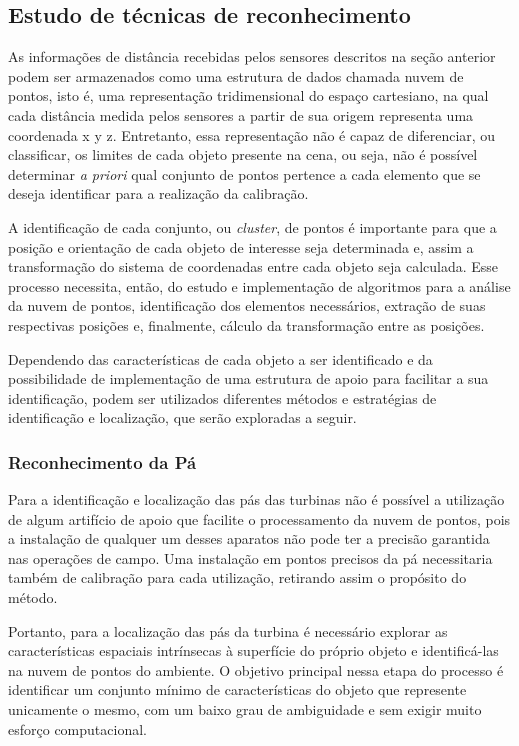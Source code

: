 \subsection{Estudo de técnicas de reconhecimento} 

As informações de distância recebidas pelos sensores descritos na seção
anterior podem ser armazenados como uma estrutura de dados chamada nuvem de
pontos, isto é, uma representação tridimensional do espaço cartesiano, na qual cada distância medida pelos
sensores a partir de sua origem representa uma coordenada x y z.
Entretanto, essa representação não é capaz de diferenciar, ou classificar, os
limites de cada objeto presente na cena, ou seja, não é possível determinar
\textit{a priori} qual conjunto de pontos pertence a cada elemento que se deseja
identificar para a realização da calibração.

A identificação de cada conjunto, ou \textit{cluster}, de pontos é importante
para que a posição e orientação de cada objeto de interesse seja determinada e,
assim a transformação do sistema de coordenadas entre cada objeto seja
calculada. Esse processo necessita, então, do estudo e implementação de
algoritmos para a análise da nuvem de pontos, identificação dos elementos
necessários, extração de suas respectivas posições e, finalmente, cálculo da
transformação entre as posições. 

Dependendo das características de cada objeto a ser identificado e da
possibilidade de implementação de uma estrutura de apoio para facilitar a sua
identificação, podem ser utilizados diferentes métodos e estratégias de
identificação e localização, que serão exploradas a seguir.

\subsubsection{Reconhecimento da Pá} 

Para a identificação e localização das pás das turbinas não é possível a
utilização de algum artifício de apoio que facilite o processamento da nuvem de
pontos, pois a instalação de qualquer um desses aparatos não pode ter a precisão
garantida nas operações de campo. Uma instalação em pontos precisos
da pá necessitaria também de calibração para cada utilização, retirando assim
o propósito do método. 

Portanto, para a localização das pás da turbina é
necessário explorar as características espaciais intrínsecas à superfície do
próprio objeto e identificá-las na nuvem de pontos do ambiente. O objetivo
principal nessa etapa do processo é identificar um conjunto mínimo de
características do objeto que represente unicamente o mesmo, com um baixo grau
de ambiguidade e sem exigir muito esforço computacional. 

